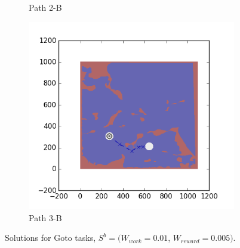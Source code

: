 \documentclass{tamuccthesis}
\begin{document}
\begin{figure}[H]
\begin{subfigure}[b]{0.24\textwidth}
        \caption{Path 2-B}   
        \label{fig:Path_2-B_upReward_upWork_b}
    \end{subfigure}
  \begin{subfigure}[b]{0.24\textwidth}
        \centering
        \includegraphics[width=\textwidth,trim={4cm 3cm 2cm 3cm},clip]{EXP3RG_PathCb_-1_-1_0d01_0d005.png}
        \caption{Path 3-B}    
        \label{fig:Path_3-B_upReward_upWork_b}
    \end{subfigure}
    \caption[Solutions for Goto tasks using weights $S^b$.]{Solutions for Goto tasks, $S^b = (W_{work} = 0.01$, $W_{reward} = 0.005)$.}
    \label{fig:weights_Sb}
\end{figure}
\end{document}
